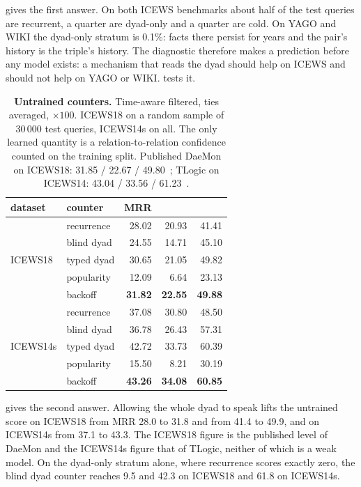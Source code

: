  gives the first answer. On both ICEWS benchmarks about half of the test queries are recurrent, a quarter are dyad-only and a quarter are cold. On YAGO and WIKI the dyad-only stratum is 0.1\%: facts there persist for years and the pair's history is the triple's history. The diagnostic therefore makes a prediction before any model exists: a mechanism that reads the dyad should help on ICEWS and should not help on YAGO or WIKI.  tests it.

\begin{table}[t]
  \centering\small
  \caption{\textbf{Untrained counters.} Time-aware filtered, ties averaged, $\times 100$. ICEWS18 on a random sample of 30\,000 test queries, ICEWS14s on all. The only learned quantity is a relation-to-relation confidence counted on the training split. Published DaeMon on ICEWS18: 31.85 / 22.67 / 49.80~\cite{dong2025dimnet}; TLogic on ICEWS14: 43.04 / 33.56 / 61.23~\cite{liu2022tlogic}.}
  \label{tab:diag}
  \begin{tabular}{llrrr}
    \toprule
    dataset & counter & MRR & \hone{} & \hten{} \\
    \midrule
    \multirow{5}{*}{ICEWS18}
      & recurrence  & 28.02 & 20.93 & 41.41 \\
      & blind dyad  & 24.55 & 14.71 & 45.10 \\
      & typed dyad  & 30.65 & 21.05 & 49.82 \\
      & popularity  & 12.09 &  6.64 & 23.13 \\
      & backoff     & \textbf{31.82} & \textbf{22.55} & \textbf{49.88} \\
    \midrule
    \multirow{5}{*}{ICEWS14s}
      & recurrence  & 37.08 & 30.80 & 48.50 \\
      & blind dyad  & 36.78 & 26.43 & 57.31 \\
      & typed dyad  & 42.72 & 33.73 & 60.39 \\
      & popularity  & 15.50 &  8.21 & 30.19 \\
      & backoff     & \textbf{43.26} & \textbf{34.08} & \textbf{60.85} \\
    \bottomrule
  \end{tabular}
\end{table}

 gives the second answer. Allowing the whole dyad to speak lifts the untrained score on ICEWS18 from MRR 28.0 to 31.8 and \hten{} from 41.4 to 49.9, and on ICEWS14s from 37.1 to 43.3. The ICEWS18 figure is the published level of DaeMon and the ICEWS14s figure that of TLogic, neither of which is a weak model. On the dyad-only stratum alone, where recurrence scores exactly zero, the blind dyad counter reaches \hone{} 9.5 and \hten{} 42.3 on ICEWS18 and \hten{} 61.8 on ICEWS14s.

